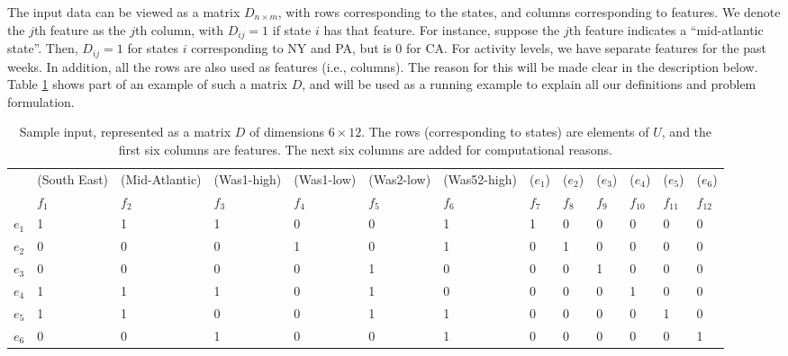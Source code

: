 The input data can be viewed as a matrix $D_{n\times m}$, with rows corresponding
to the states, and columns corresponding to features.
We denote the $j$th feature as the $j$th column, with $D_{ij}=1$ if state $i$ has
that feature. For instance, suppose the $j$th feature indicates a ``mid-atlantic state''.
Then, $D_{ij}=1$ for states $i$ corresponding to NY and PA, but is 0 for CA. 
For activity levels, we have separate features for the past weeks. 
In addition, all the rows are also used as features (i.e., columns). The reason for this will be made clear in the description below. Table \ref{sampledata} shows part of an example of such a matrix $D$, and will be
used as a running example to explain all our definitions and problem formulation.

\noindent
\begin{table}[ht!]
\begin{tiny}
\begin{center}
\begin{tabular}{| p{0.5cm}| p{1.0cm}| p{1.0cm}| p{1cm}| p{1cm}| p{1.0cm}| p{1.0cm}|p{0.5cm}|p{0.5cm}|p{0.5cm}|p{0.5cm}|p{0.5cm}|p{0.5cm}|} \hline
& (South East) & (Mid-Atlantic) & (Was1-high) & (Was1-low) & (Was2-low) & (Was52-high) & ($e_1$) & ($e_2$) & ($e_3$) & ($e_4$) & ($e_5$) & ($e_6$)\\ 
& $f_1$& $f_2$ & $f_3$  & $f_4$ & $f_5$ & $f_6$ & $f_7$ & $f_8$ & $f_ 9$ & $f_{10}$ & $f_{11}$ & $f_{12}$ \\ \hline
$e_1$ & 1 & 1 & 1 & 0 & 0 & 1 & 1 & 0 & 0 & 0 & 0 & 0\\ \hline
$e_2$ & 0 & 0 & 0 & 1 & 0 & 1 & 0 & 1 & 0 & 0 & 0 & 0\\ \hline
$e_3$ & 0 & 0 & 0 & 0 & 1 & 0 & 0 & 0 & 1 & 0 & 0 & 0\\ \hline
$e_4$ & 1 & 1 & 1 & 0 & 1 & 0 & 0 & 0 & 0 & 1 & 0 & 0\\ \hline 
$e_5$ & 1 & 1 & 0 & 0 & 1 & 1 & 0 & 0 & 0 & 0 & 1 & 0\\ \hline
$e_6$ & 0 & 0 & 1 & 0 & 0 & 1 & 0 & 0 & 0 & 0 & 0 & 1\\
\hline
\end{tabular}
\caption{
Sample input, represented as a matrix $D$ of dimensions $6\times 12$. The rows (corresponding to states) are elements of $U$, and the first six columns are features. The next six columns are added for computational reasons.
}
\label{sampledata}
\end{center}
\end{tiny}
\end{table}


